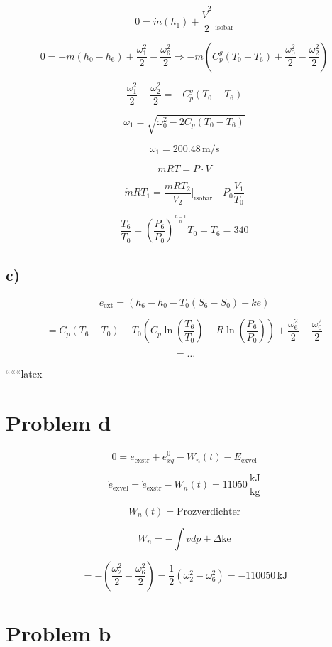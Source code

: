 \[
0 = \dot{m}(h_1) + \frac{\dot{V}^2}{2} \bigg|_{\text{isobar}}
\]

\[
0 = -\dot{m}(h_0 - h_6) + \frac{\omega_1^2}{2} - \frac{\omega_6^2}{2} \Rightarrow -\dot{m}(C_p^g(T_0 - T_6) + \frac{\omega_0^2}{2} - \frac{\omega_2^2}{2})
\]

\[
\frac{\omega_1^2}{2} - \frac{\omega_2^2}{2} = -C_p^g(T_0 - T_6)
\]

\[
\omega_1 = \sqrt{\omega_0^2 - 2C_p(T_0 - T_6)}
\]

\[
\omega_1 = 200.48 \, \text{m/s}
\]

\[
mRT = P \cdot V
\]

\[
\dot{m}RT_1 = \frac{mR T_2}{V_2} \bigg|_{\text{isobar}} \quad P_0 \frac{V_1}{T_0}
\]

\[
\frac{T_6}{T_0} = \left( \frac{P_6}{P_0} \right)^{\frac{n-1}{n}} T_0 = T_6 = 340
\]

\subsection*{c)}

\[
\dot{e}_{\text{ext}} = (h_6 - h_0 - T_0(S_6 - S_0) + ke)
\]

\[
= C_p(T_6 - T_0) - T_0 \left( C_p \ln \left( \frac{T_6}{T_0} \right) - R \ln \left( \frac{P_6}{P_0} \right) \right) + \frac{\omega_6^2}{2} - \frac{\omega_0^2}{2}
\]

\[
= \ldots
\]

``````latex


\section*{Problem d}

\[
0 = \dot{e}_{\text{exstr}} + \dot{e}_{xq}^0 - W_n(t) - \dot{E}_{\text{exvel}}
\]

\[
\dot{e}_{\text{exvel}} = \dot{e}_{\text{exstr}} - W_n(t) = 11050 \, \frac{\text{kJ}}{\text{kg}}
\]

\[
W_n(t) = \text{Prozverdichter}
\]

\[
W_n = -\int \dot{v} dp + \Delta \text{ke}
\]

\[
= -\left( \frac{\omega_2^2}{2} - \frac{\omega_6^2}{2} \right) = \frac{1}{2} (\omega_2^2 - \omega_6^2) = -110050 \, \text{kJ}
\]

\section*{Problem b}


